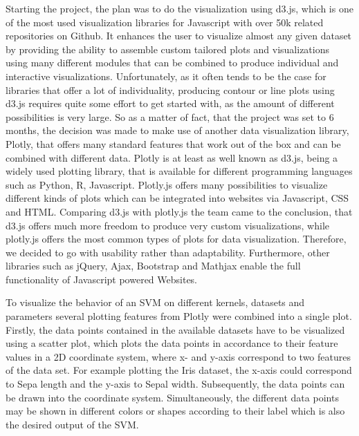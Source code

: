 \documentclass{scrartcl}
\begin{document}
Starting the project, the plan was to do the visualization using d3.js, which is one of the most used visualization libraries for Javascript with over 50k related repositories on Github. It enhances the user to visualize almost any given dataset by providing the ability to assemble custom tailored plots and visualizations using many different modules that can be combined to produce individual and interactive visualizations. Unfortunately, as it often tends to be the case for libraries that offer a lot of individuality, producing contour or line plots using d3.js requires quite some effort to get started with, as the amount of different possibilities is very large. So as a matter of fact, that the project was set to 6 months, the decision was made to make use of another data visualization library, Plotly, that offers many standard features that work out of the box and can be combined with different data.
Plotly is at least as well known as d3.js, being a widely used plotting library, that is available for different programming languages such as Python, R, Javascript. Plotly.js offers many possibilities to visualize different kinds of plots which can be integrated into websites via Javascript, CSS and HTML. Comparing d3.js with plotly.js the team came to the conclusion, that d3.js offers much more freedom to produce very custom visualizations, while plotly.js offers the most common types of plots for data visualization. Therefore, we decided to go with usability rather than adaptability.
Furthermore, other libraries such as jQuery, Ajax, Bootstrap and Mathjax enable the full functionality of Javascript powered Websites.


To visualize the behavior of an SVM on different kernels, datasets and parameters several plotting features from Plotly were combined into a single plot. 
Firstly, the data points contained in the available datasets have to be visualized using a scatter plot, which plots the data points in accordance to their feature values in a 2D coordinate system, where x- and y-axis correspond to two features of the data set. 
For example plotting the Iris dataset, the x-axis could correspond to Sepa length and the y-axis to Sepal width. Subsequently, the data points can be drawn into the coordinate system. Simultaneously, the different data points may be shown in different colors or shapes according to their label which is also the desired output of the SVM.
\end{document}
